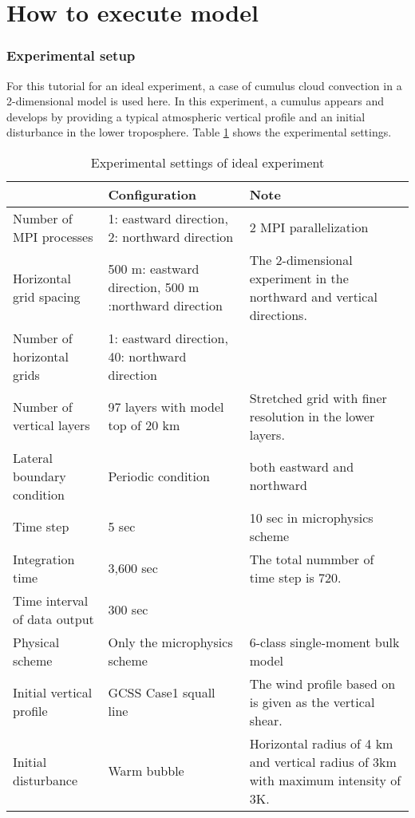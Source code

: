 \section{How to execute model} \label{sec:ideal_exp_run}


\subsubsection{Experimental setup}
For this tutorial for an ideal experiment, a case of cumulus cloud convection in a 2-dimensional model is used here.
In this experiment, a cumulus appears and develops by providing a typical atmospheric vertical profile
and an initial disturbance in the lower troposphere.
Table \ref{tab:setting_ideal} shows the experimental settings.

\begin{table}[htb]
\begin{minipage}{150mm}
\begin{center}
\caption{Experimental settings of ideal experiment}
\begin{tabularx}{150mm}{|l|X|X|} \hline
 \rowcolor[gray]{0.9} ~~ & Configuration & Note \\ \hline
 Number of MPI processes& 1: eastward direction, 2: northward direction & 2 MPI parallelization \\ \hline
 Horizontal grid spacing & 500 m: eastward direction, 500 m :northward direction & The 2-dimensional experiment in the northward and vertical directions. \\ \hline
 Number of horizontal grids & 1: eastward direction, 40: northward direction &  \\ \hline
 Number of vertical layers & 97 layers with model top of 20 km & Stretched grid with finer resolution in the lower layers. \\ \hline
 Lateral boundary condition & Periodic condition & both eastward and northward \\ \hline
 Time step & 5 sec      &  10 sec in microphysics scheme\\ \hline
 Integration time     & 3,600 sec & The total nummber of time step is 720.\\ \hline
 Time interval of data output & 300 sec  &  \\ \hline
 Physical scheme & Only the microphysics scheme &
 6-class single-moment bulk model \citep{tomita_2008} \\ \hline
 Initial vertical profile & GCSS Case1 squall line \citep{Redelsperger2000}&
 The wind profile based on \citet{Ooyama_2001} is given as the vertical shear. \\ \hline
 Initial disturbance & Warm bubble & Horizontal radius of 4 km and
 vertical radius of 3km with  maximum intensity of 3K.\\ \hline
\end{tabularx}
\label{tab:setting_ideal}
\end{center}
\end{minipage}
\end{table}


